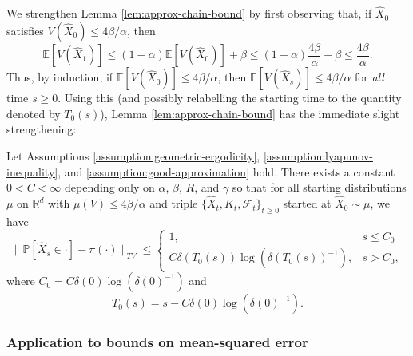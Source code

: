 We strengthen Lemma \ref{lem:approx-chain-bound} by first observing that, if $\hat{X}_0$ satisfies $V(\hat{X}_0) \leq 4 \beta / \alpha$, then
\begin{equation}
    \mathbb{E}[V(\hat{X}_1)] \leq (1-\alpha) \mathbb{E}[ V(\hat{X}_0)]+ \beta \leq (1-\alpha) \frac{4 \beta}{\alpha} + \beta \leq \frac{4 \beta}{\alpha}.
\end{equation}
Thus, by induction, if $\mathbb{E}[V(\hat{X}_{0})] \leq 4 \beta / \alpha$, then $\mathbb{E}[V(\hat{X}_s)] \leq 4 \beta / \alpha$ for \textit{all} time $s \geq 0$. Using this (and possibly relabelling the starting time to the quantity denoted by $T_{0}(s)$), Lemma \ref{lem:approx-chain-bound} has the immediate slight strengthening:
\begin{lemma}
  Let Assumptions \ref{assumption:geometric-ergodicity}, \ref{assumption:lyapunov-inequality}, and \ref{assumption:good-approximation} hold. There exists a constant $0 < C < \infty$ depending only on $\alpha$, $\beta$, $R$, and $\gamma$ so that for all starting distributions $\mu$ on $\mathbb{R}^{d}$ with $\mu(V) \leq 4 \beta / \alpha$ and triple $\{\hat{X}_t, \hat{K}_t, \mathcal{F}_t\}_{t \geq 0}$ started at $\hat{X}_0 \sim \mu$, we have 
  \begin{equation*}
\| \mathbb{P}[\hat{X}_s \in \cdot] - \pi(\cdot) \|_{TV} \leq \begin{cases}
1, & s \leq C_0 \\
  C \delta( T_{0}(s) ) \log{(\delta(T_{0}(s))^{-1})}, & s > C_0,
\end{cases}
  \end{equation*}
where $C_0 = C \delta(0) \log{(\delta(0)^{-1})}$ and 
\begin{equation}
T_{0}(s) = s - C \delta(0) \log{(\delta(0)^{-1})}.
\label{EqT0Def}
\end{equation}
  \label{lem:approx-chain-bound-distribution}
\end{lemma}

\subsubsection{Application to bounds on mean-squared error}

